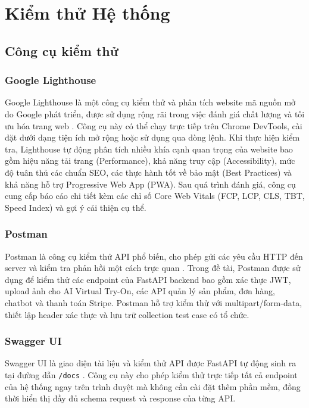 \section{Kiểm thử Hệ thống}

\subsection{Công cụ kiểm thử}

\subsubsection{Google Lighthouse}
Google Lighthouse là một công cụ kiểm thử và phân tích website 
mã nguồn mở do Google phát triển, được sử dụng rộng rãi trong 
việc đánh giá chất lượng và tối ưu hóa trang web \cite{lighthouse_docs}. 
Công cụ này có thể chạy trực tiếp trên Chrome DevTools, cài đặt 
dưới dạng tiện ích mở rộng hoặc sử dụng qua dòng lệnh. Khi thực 
hiện kiểm tra, Lighthouse tự động phân tích nhiều khía cạnh quan 
trọng của website bao gồm hiệu năng tải trang (Performance), khả 
năng truy cập (Accessibility), mức độ tuân thủ các chuẩn SEO, 
các thực hành tốt về bảo mật (Best Practices) và khả năng hỗ trợ 
Progressive Web App (PWA). Sau quá trình đánh giá, công cụ cung 
cấp báo cáo chi tiết kèm các chỉ số Core Web Vitals (FCP, LCP, 
CLS, TBT, Speed Index) và gợi ý cải thiện cụ thể.

\subsubsection{Postman}
Postman là công cụ kiểm thử API phổ biến, cho phép gửi các yêu 
cầu HTTP đến server và kiểm tra phản hồi một cách trực quan 
\cite{postman_docs}. Trong đề tài, Postman được sử dụng để kiểm 
thử các endpoint của FastAPI backend bao gồm xác thực JWT, upload 
ảnh cho AI Virtual Try-On, các API quản lý sản phẩm, đơn hàng, 
chatbot và thanh toán Stripe. Postman hỗ trợ kiểm thử với 
multipart/form-data, thiết lập header xác thực và lưu trữ 
collection test case có tổ chức.

\subsubsection{Swagger UI}
Swagger UI là giao diện tài liệu và kiểm thử API được FastAPI 
tự động sinh ra tại đường dẫn \texttt{/docs} \cite{fastapi_docs}. 
Công cụ này cho phép kiểm thử trực tiếp tất cả endpoint của hệ 
thống ngay trên trình duyệt mà không cần cài đặt thêm phần mềm, 
đồng thời hiển thị đầy đủ schema request và response của từng API.

